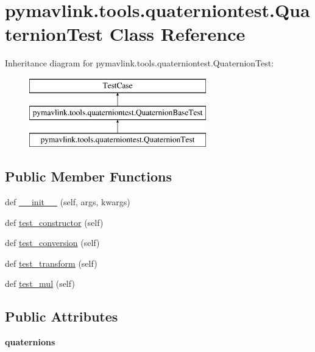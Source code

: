 \hypertarget{classpymavlink_1_1tools_1_1quaterniontest_1_1QuaternionTest}{}\section{pymavlink.\+tools.\+quaterniontest.\+Quaternion\+Test Class Reference}
\label{classpymavlink_1_1tools_1_1quaterniontest_1_1QuaternionTest}
Inheritance diagram for pymavlink.\+tools.\+quaterniontest.\+Quaternion\+Test\+:\begin{figure}[H]
\begin{center}
\leavevmode
\includegraphics[height=3.000000cm]{classpymavlink_1_1tools_1_1quaterniontest_1_1QuaternionTest}
\end{center}
\end{figure}
\subsection*{Public Member Functions}
\begin{DoxyCompactItemize}
\item 
def \hyperlink{classpymavlink_1_1tools_1_1quaterniontest_1_1QuaternionTest_af9372f3d553394cdac122667343565cc}{\+\_\+\+\_\+init\+\_\+\+\_\+} (self, args, kwargs)
\item 
def \hyperlink{classpymavlink_1_1tools_1_1quaterniontest_1_1QuaternionTest_ad6f0db1b8ac972f86e6a51099a09a6ba}{test\+\_\+constructor} (self)
\item 
def \hyperlink{classpymavlink_1_1tools_1_1quaterniontest_1_1QuaternionTest_a3eb922ec56fe138902c7e5dd7c847f44}{test\+\_\+conversion} (self)
\item 
def \hyperlink{classpymavlink_1_1tools_1_1quaterniontest_1_1QuaternionTest_a38e3059967c47c61c00ae3625f504f71}{test\+\_\+transform} (self)
\item 
def \hyperlink{classpymavlink_1_1tools_1_1quaterniontest_1_1QuaternionTest_a508835e7727bb15fe4fd8570bc4aadee}{test\+\_\+mul} (self)
\end{DoxyCompactItemize}
\subsection*{Public Attributes}
\begin{DoxyCompactItemize}
\item 
\mbox{\label{classpymavlink_1_1tools_1_1quaterniontest_1_1QuaternionTest_a45c88ba8ba6a84f1aee8c412708587b3}} 
{\bfseries quaternions}
\end{DoxyCompactItemize}


